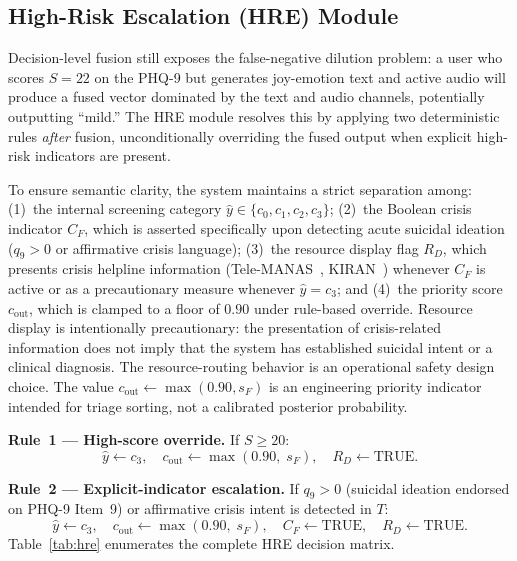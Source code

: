 \documentclass[10pt, conference, letterpaper]{IEEEtran}
\begin{document}
\subsection{High-Risk Escalation (HRE) Module}
\label{sec:hre}

Decision-level fusion still exposes the false-negative dilution problem: a
user who scores $S = 22$ on the PHQ-9 but generates joy-emotion text and
active audio will produce a fused vector dominated by the text and audio
channels, potentially outputting ``mild.''
The HRE module resolves this by applying two deterministic rules
\textit{after} fusion, unconditionally overriding the fused output when
explicit high-risk indicators are present.

To ensure semantic clarity, the system maintains a strict separation among:
(1)~the internal screening category $\hat{y} \in \{c_0, c_1, c_2, c_3\}$;
(2)~the Boolean crisis indicator $C_F$, which is asserted specifically upon
detecting acute suicidal ideation ($q_9 > 0$ or affirmative crisis language);
(3)~the resource display flag $R_D$, which presents crisis helpline information
(Tele-MANAS~\cite{telemanas2022}, KIRAN~\cite{kiran2020}) whenever $C_F$ is active or as a
precautionary measure whenever $\hat{y} = c_3$; and
(4)~the priority score $c_{\text{out}}$, which is clamped to a floor of $0.90$
under rule-based override.
Resource display is intentionally precautionary: the presentation of crisis-related
information does not imply that the system has established suicidal intent or
a clinical diagnosis. The resource-routing behavior is an operational safety
design choice.
The value $c_{\text{out}} \leftarrow \max(0.90, s_F)$ is an engineering priority
indicator intended for triage sorting, not a calibrated posterior probability.

\noindent\textbf{Rule~1 — High-score override.} If $S \ge 20$:
\begin{equation}
  \hat{y} \leftarrow c_3,\quad
  c_{\text{out}} \leftarrow \max(0.90,\; s_F),\quad
  R_D \leftarrow \text{TRUE}.
  \label{eq:hre_severe}
\end{equation}

\noindent\textbf{Rule~2 — Explicit-indicator escalation.}
If $q_9 > 0$ (suicidal ideation endorsed on PHQ-9 Item~9) or affirmative crisis
intent is detected in $T$:
\begin{equation}
  \hat{y} \leftarrow c_3,\quad
  c_{\text{out}} \leftarrow \max(0.90,\; s_F),\quad
  C_F \leftarrow \text{TRUE},\quad
  R_D \leftarrow \text{TRUE}.
  \label{eq:hre_escalate}
\end{equation}
Table~\ref{tab:hre} enumerates the complete HRE decision matrix.
\end{document}
